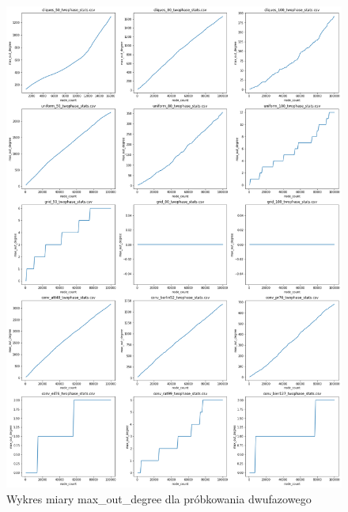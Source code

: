 \begin{figure}[]
    \centering
    \includegraphics[width=\textwidth]{chapters/experiments/img/merged_plots/main_twophase/max_out_degree.png}
    \caption{Wykres miary max\_out\_degree dla próbkowania dwufazowego}
    \label{fig:included_max_degree}
\end{figure}

